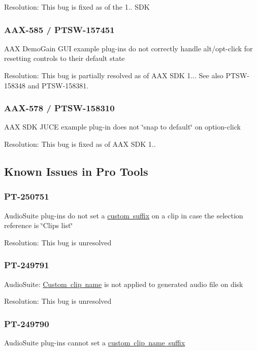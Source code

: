 Resolution\+: This bug is fixed as of the 1.. S\+DK\hypertarget{a00846_AAX-585}{}\subsubsection{A\+A\+X-\/585 / P\+T\+S\+W-\/157451}\label{a00846_AAX-585}
A\+AX Demo\+Gain G\+UI example plug-\/ins do not correctly handle alt/opt-\/click for resetting controls to their default state

Resolution\+: This bug is partially resolved as of A\+AX S\+DK 1... See also P\+T\+S\+W-\/158348 and P\+T\+S\+W-\/158381.\hypertarget{a00846_AAX-578}{}\subsubsection{A\+A\+X-\/578 / P\+T\+S\+W-\/158310}\label{a00846_AAX-578}
A\+AX S\+DK J\+U\+CE example plug-\/in does not \char`\"{}snap to default\char`\"{} on option-\/click

Resolution\+: This bug is fixed as of A\+AX S\+DK 1..\hypertarget{a00846_knownissues_ptsw}{}\subsection{Known Issues in Pro Tools}\label{a00846_knownissues_ptsw}
\hypertarget{a00846_PT-250751}{}\subsubsection{P\+T-\/250751}\label{a00846_PT-250751}
Audio\+Suite plug-\/ins do not set a \mbox{\hyperlink{a01697_a60a29fda8490f240ecf869ff14fabf0e}{custom suffix}} on a clip in case the selection reference is \char`\"{}\+Clips list\char`\"{}

Resolution\+: This bug is unresolved\hypertarget{a00846_PT-249791}{}\subsubsection{P\+T-\/249791}\label{a00846_PT-249791}
Audio\+Suite\+: \mbox{\hyperlink{a01697_a60a29fda8490f240ecf869ff14fabf0e}{Custom clip name}} is not applied to generated audio file on disk

Resolution\+: This bug is unresolved\hypertarget{a00846_PT-249790}{}\subsubsection{P\+T-\/249790}\label{a00846_PT-249790}
Audio\+Suite plug-\/ins cannot set a \mbox{\hyperlink{a01697_a60a29fda8490f240ecf869ff14fabf0e}{custom clip name suffix}}

